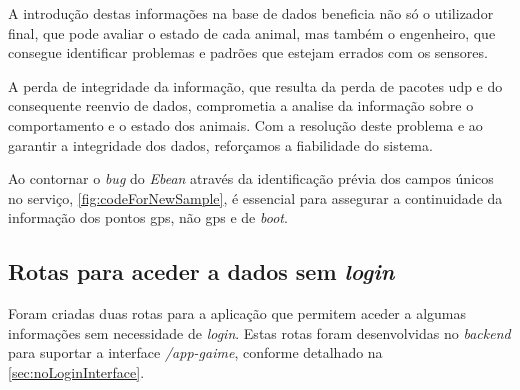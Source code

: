 
A introdução destas informações na base de dados beneficia não só o utilizador final, que pode avaliar o estado de cada animal, mas também o engenheiro, que consegue identificar problemas e padrões que estejam errados com os sensores.

A perda de integridade da informação, que resulta da perda de pacotes \acs{udp} e do consequente reenvio de dados, comprometia a analise da informação sobre o comportamento e o estado dos animais. Com a resolução deste problema e ao garantir a integridade dos dados, reforçamos a fiabilidade do sistema.

Ao contornar o \textit{bug} do \textit{Ebean} através da identificação prévia dos campos únicos no serviço, \autoref{fig:codeForNewSample}, é essencial para assegurar a continuidade da informação dos pontos \acs{gps}, não \acs{gps} e de \textit{boot}.

\clearpage
\subsection{Rotas para aceder a dados sem \textit{login}}\label{sec:noLoginAppGaime} %




Foram criadas duas rotas para a aplicação que permitem aceder a algumas informações sem necessidade de \textit{login}. Estas rotas foram desenvolvidas no \textit{backend} para suportar a interface \textit{/app-gaime}, conforme detalhado na \autoref{sec:noLoginInterface}.

